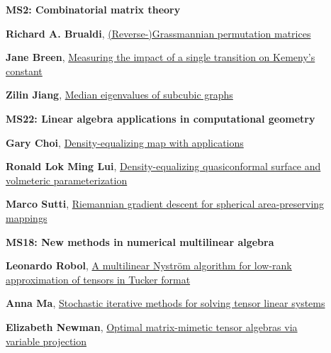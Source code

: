 \documentclass[ILAS2025-program.tex]{subfiles}
\begin{document}
\begin{description}
\begin{description}
{}
        \end{description}
    \begin{description}
    \item[] {\color{mstitle}\textbf{MS2: Combinatorial matrix theory}} 
    \item[] \hypertarget{up0031}{}\textbf{Richard A. Brualdi}, \hyperlink{down0031}{(Reverse-)Grassmannian permutation matrices}
        \item[] \hypertarget{up0032}{}\textbf{Jane Breen}, \hyperlink{down0032}{Measuring the impact of a single transition on Kemeny's constant
}
        \item[] \hypertarget{up0033}{}\textbf{Zilin Jiang}, \hyperlink{down0033}{Median eigenvalues of subcubic graphs}
        \end{description}
    \begin{description}
    \item[] {\color{mstitle}\textbf{MS22: Linear algebra applications in computational geometry}} 
    \item[] \hypertarget{up0034}{}\textbf{Gary Choi}, \hyperlink{down0034}{Density-equalizing map with applications}
        \item[] \hypertarget{up0035}{}\textbf{Ronald Lok Ming Lui}, \hyperlink{down0035}{Density-equalizing quasiconformal surface and volmeteric parameterization}
        \item[] \hypertarget{up0036}{}\textbf{Marco Sutti}, \hyperlink{down0036}{Riemannian gradient descent for spherical area-preserving mappings
}
        \end{description}
    \begin{description}
    \item[] {\color{mstitle}\textbf{MS18: New methods in numerical multilinear algebra}} 
    \item[] \hypertarget{up0037}{}\textbf{Leonardo Robol}, \hyperlink{down0037}{A multilinear Nyström algorithm for low-rank approximation of tensors in Tucker format}
        \item[] \hypertarget{up0038}{}\textbf{Anna Ma}, \hyperlink{down0038}{Stochastic iterative methods for solving tensor linear systems}
        \item[] \hypertarget{up0039}{}\textbf{Elizabeth Newman}, \hyperlink{down0039}{Optimal matrix-mimetic tensor algebras via variable projection
}
\end{description}
\end{description}
\end{document}
